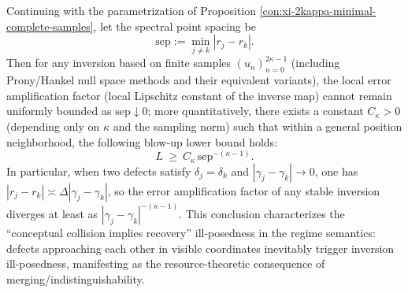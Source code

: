 



\begin{proposition}\label{con:xi-collision-illposedness-sep-blowup}
Continuing with the parametrization of Proposition \ref{con:xi-2kappa-minimal-complete-samples}, let the spectral point spacing be
\[
\mathrm{sep}:=\min_{j\neq k}|r_j-r_k|.
\]
Then for any inversion based on finite samples \((u_n)_{n=0}^{2\kappa-1}\) (including Prony/Hankel null space methods and their equivalent variants), the local error amplification factor (local Lipschitz constant of the inverse map) cannot remain uniformly bounded as \(\mathrm{sep}\downarrow 0\); more quantitatively, there exists a constant \(C_\kappa>0\) (depending only on \(\kappa\) and the sampling norm) such that within a general position neighborhood, the following blow-up lower bound holds:
\[
L\ \ge\ C_\kappa\,\mathrm{sep}^{-(\kappa-1)}.
\]
In particular, when two defects satisfy \(\delta_j=\delta_k\) and \(|\gamma_j-\gamma_k|\to 0\), one has \(|r_j-r_k|\asymp \Delta|\gamma_j-\gamma_k|\), so the error amplification factor of any stable inversion diverges at least as \(|\gamma_j-\gamma_k|^{-(\kappa-1)}\).
This conclusion characterizes the ``conceptual collision implies recovery'' ill-posedness in the regime semantics: defects approaching each other in visible coordinates inevitably trigger inversion ill-posedness, manifesting as the resource-theoretic consequence of merging/indistinguishability.
\end{proposition}

